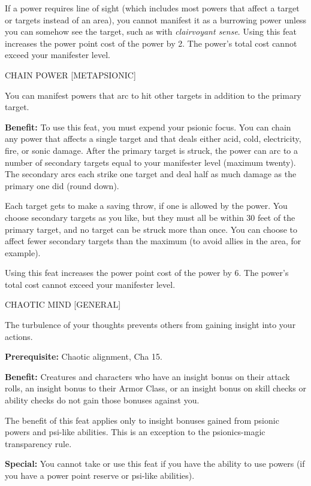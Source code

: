 \documentclass{article}
\begin{document}
If a power requires line of sight (which includes most powers that affect a target 
or targets instead of an area), you cannot manifest it as a burrowing power unless 
you can somehow see the target, such as with \textit{clairvoyant sense}. Using 
this feat increases the power point cost of the power by 2. The power's total cost 
cannot exceed your manifester level.

\vspace{12pt}
CHAIN POWER [METAPSIONIC]

You can manifest powers that arc to hit other targets in addition to the primary 
target. 

\textbf{Benefit:} To use this feat, you must expend your psionic focus. You can 
chain any power that affects a single target and that deals either acid, cold, 
electricity, fire, or sonic damage. After the primary target is struck, the power 
can arc to a number of secondary targets equal to your manifester level (maximum 
twenty). The secondary arcs each strike one target and deal half as much damage 
as the primary one did (round down).

Each target gets to make a saving throw, if one is allowed by the power. You choose 
secondary targets as you like, but they must all be within 30 feet of the primary 
target, and no target can be struck more than once. You can choose to affect fewer 
secondary targets than the maximum (to avoid allies in the area, for example).

Using this feat increases the power point cost of the power by 6. The power's total 
cost cannot exceed your manifester level.

\vspace{12pt}
CHAOTIC MIND [GENERAL]

The turbulence of your thoughts prevents others from gaining insight into your 
actions.

\textbf{Prerequisite:} Chaotic alignment, Cha 15.

\textbf{Benefit:} Creatures and characters who have an insight bonus on their attack 
rolls, an insight bonus to their Armor Class, or an insight bonus on skill checks 
or ability checks do not gain those bonuses against you.

The benefit of this feat applies only to insight bonuses gained from psionic powers 
and psi-like abilities. This is an exception to the psionics-magic transparency 
rule.

\textbf{Special:} You cannot take or use this feat if you have the ability to use 
powers (if you have a power point reserve or psi-like abilities).
\end{document}
